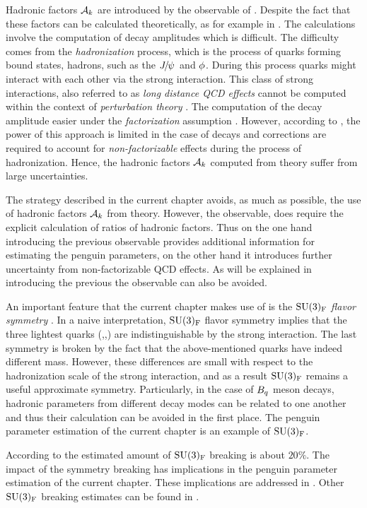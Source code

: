 Hadronic factors $\mathcal{A}_{k}$ are introduced by the  observable of .
Despite the fact that these factors can be calculated theoretically, as for example
in \cite{DeBruyn-thesis}. The calculations involve the computation of \BJpsiX decay amplitudes
which is difficult. The difficulty comes from the {\it hadronization} process, which is the
process of quarks forming bound states, hadrons, such as the ${J\mskip -3mu/\mskip -2mu\psi\mskip 2mu}$ and $\phi$.
During this process quarks might interact with each other via the strong interaction.
This class of strong interactions, also referred to as {\it long distance QCD effects}
cannot be computed within the context of {\it perturbation theory} \cite{DeBruyn:2014oga,DeBruyn-thesis}.
The computation of the \BJpsiX decay amplitude easier under the
{\it factorization} assumption \cite{HAAN1970448,Wirbel1985,CABIBBO1978418,FAKIROV1978315}.
However, according to \cite{DeBruyn:2014oga,DeBruyn-thesis},
the power of this approach is limited in the case of \BJpsiX decays and corrections
are required to account for {\it non-factorizable} effects during the process of hadronization.
Hence, the hadronic factors $\mathcal{A}_{k}$ computed from theory suffer from large uncertainties.

The strategy described in the current chapter avoids, as much as possible, the use of hadronic
factors $\mathcal{A}_{k}$ from theory. However, the  observable, does require the explicit
calculation of ratios of hadronic factors. Thus on the one hand
introducing the previous observable provides additional information for estimating the penguin
parameters, on the other hand it introduces further uncertainty from non-factorizable QCD effects.
As will be explained in  introducing the previous the 
observable can also be avoided.

An important feature that the current chapter makes use of is the
$\mathrm{SU}(3)_{\rm F}$ {\it flavor symmetry} \cite{GELLMANN1964214,NEEMAN1961222}.
In a naive interpretation, $\mathrm{SU}(3)_{\rm F}$ flavor symmetry implies that the three lightest quarks (\uquark,\dquark,\squark)
are indistinguishable by the strong interaction. The last symmetry is broken by the fact that the above-mentioned
quarks have indeed different mass. However, these differences are small with respect
to the hadronization scale \lqcd of the strong interaction, and as a result $\mathrm{SU}(3)_{\rm F}$
remains a useful approximate symmetry. Particularly, in the case of $B_q$ meson decays, hadronic
parameters from different decay modes can be related to one another and thus their calculation can be avoided
in the first place. The penguin parameter estimation of the current chapter is an example of $\mathrm{SU}(3)_{\rm F}$.

According to \cite{Nagashima:2007qn,Gronau:2013mda} the estimated amount of $\mathrm{SU}(3)_{\rm F}$ breaking is about $20\%$.
The impact of the symmetry breaking has implications in the penguin parameter estimation
of the current chapter. These implications are addressed in .
Other $\mathrm{SU}(3)_{\rm F}$ breaking estimates can be found in \cite{Charles:2015gya,PDG}.
